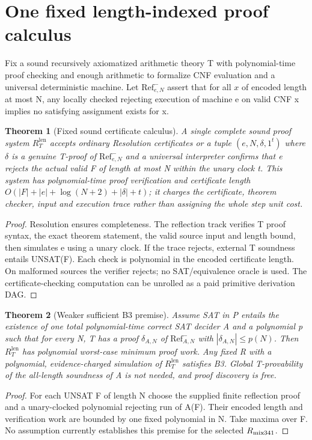 \documentclass[11pt]{article}
\newtheorem{theorem}{Theorem}
\begin{document}
\section{One fixed length-indexed proof calculus}
Fix a sound recursively axiomatized arithmetic theory T with polynomial-time proof checking and enough arithmetic to formalize CNF evaluation and a universal deterministic machine. Let $\mathrm{Ref}^{-}_{e,N}$ assert that for all $x$ of encoded length at most N, any locally checked rejecting execution of machine e on valid CNF x implies no satisfying assignment exists for x.
\begin{theorem}[Fixed sound certificate calculus]
A single complete sound proof system $R_T^{\mathrm{len}}$ accepts ordinary Resolution certificates or a tuple $(e,N,\delta,1^t)$ where $\delta$ is a genuine T-proof of $\mathrm{Ref}^{-}_{e,N}$ and a universal interpreter confirms that e rejects the actual valid F of length at most N within the unary clock t. This system has polynomial-time proof verification and certificate length $O(|F|+|e|+\log(N+2)+|\delta|+t)$; it charges the certificate, theorem checker, input and execution trace rather than assigning the whole step unit cost.
\end{theorem}
\begin{proof}
Resolution ensures completeness. The reflection track verifies T proof syntax, the exact theorem statement, the valid source input and length bound, then simulates e using a unary clock. If the trace rejects, external T soundness entails UNSAT(F). Each check is polynomial in the encoded certificate length. On malformed sources the verifier rejects; no SAT/equivalence oracle is used. The certificate-checking computation can be unrolled as a paid primitive derivation DAG.
\end{proof}
\begin{theorem}[Weaker sufficient B3 premise]
Assume SAT in P entails the existence of \emph{one} total polynomial-time correct SAT decider A and a polynomial p such that for every N, T has a proof $\delta_{A,N}$ of $\mathrm{Ref}^{-}_{A,N}$ with $|\delta_{A,N}|\le p(N)$. Then $R_T^{\mathrm{len}}$ has polynomial worst-case minimum proof work. Any fixed R with a polynomial, evidence-charged simulation of $R_T^{\mathrm{len}}$ satisfies B3. Global T-provability of the all-length soundness of A is not needed, and proof discovery is free.
\end{theorem}
\begin{proof}
For each UNSAT F of length N choose the supplied finite reflection proof and a unary-clocked polynomial rejecting run of A(F). Their encoded length and verification work are bounded by one fixed polynomial in N. Take maxima over F. No assumption currently establishes this premise for the selected $R_{\rm mix341}$.
\end{proof}
\end{document}
